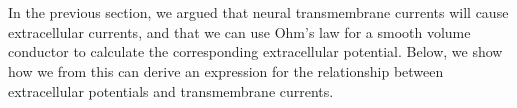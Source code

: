 

\section{}
\label{sec:Basics:ECSpot}
In the previous section, we argued that neural transmembrane currents will cause extracellular currents, and that we can use Ohm's law for a smooth volume conductor to calculate the corresponding extracellular potential. Below, we show how we from this can derive an expression for the relationship between extracellular potentials and transmembrane currents.

